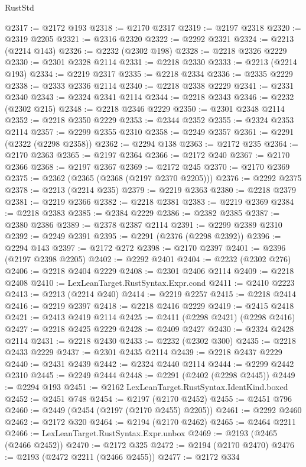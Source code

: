 \begin{lexlean}{RustStd}
\begin{coremodule}
{\begin{coremodule}
{{{{{{{{{{{{{{{{{{{{{{{{{{@2317 := @2172 @193
@2318 := @2170 @2317
@2319 := @2197 @2318
@2320 := @2319 @2205
@2321 := @2316 @2320
@2322 := @2292 @2321
@2324 := @2213 (@2214 @143)
@2326 := @2232 (@2302 @198)
@2328 := @2218 @2326 @2229
@2330 := @2301 @2328 @2114
@2331 := @2218 @2330
@2333 := @2213 (@2214 @193)
@2334 := @2219 @2317
@2335 := @2218 @2334
@2336 := @2335 @2229
@2338 := @2333 @2336 @2114
@2340 := @2218 @2338 @2229
@2341 := @2331 @2340
@2343 := @2324 @2341 @2114
@2344 := @2218 @2343
@2346 := @2232 (@2302 @215)
@2348 := @2218 @2346 @2229
@2350 := @2301 @2348 @2114
@2352 := @2218 @2350 @2229
@2353 := @2344 @2352
@2355 := @2324 @2353 @2114
@2357 := @2299 @2355 @2310
@2358 := @2249 @2357
@2361 := @2291 (@2322 (@2298 @2358))
@2362 := @2294 @138
@2363 := @2172 @235
@2364 := @2170 @2363
@2365 := @2197 @2364
@2366 := @2172 @240
@2367 := @2170 @2366
@2368 := @2197 @2367
@2369 := @2172 @245
@2370 := @2170 @2369
@2375 := @2362 (@2365 (@2368 (@2197 @2370 @2205)))
@2376 := @2292 @2375
@2378 := @2213 (@2214 @235)
@2379 := @2219 @2363
@2380 := @2218 @2379
@2381 := @2219 @2366
@2382 := @2218 @2381
@2383 := @2219 @2369
@2384 := @2218 @2383
@2385 := @2384 @2229
@2386 := @2382 @2385
@2387 := @2380 @2386
@2389 := @2378 @2387 @2114
@2391 := @2299 @2389 @2310
@2392 := @2249 @2391
@2395 := @2291 (@2376 (@2298 @2392))
@2396 := @2294 @143
@2397 := @2172 @272
@2398 := @2170 @2397
@2401 := @2396 (@2197 @2398 @2205)
@2402 := @2292 @2401
@2404 := @2232 (@2302 @276)
@2406 := @2218 @2404 @2229
@2408 := @2301 @2406 @2114
@2409 := @2218 @2408
@2410 := LexLeanTarget.RustSyntax.Expr.cond
@2411 := @2410 @2223
@2413 := @2213 (@2214 @240)
@2414 := @2219 @2257
@2415 := @2218 @2414
@2416 := @2219 @2397
@2418 := @2218 @2416 @2229
@2419 := @2415 @2418
@2421 := @2413 @2419 @2114
@2425 := @2411 (@2298 @2421) (@2298 @2416)
@2427 := @2218 @2425 @2229
@2428 := @2409 @2427
@2430 := @2324 @2428 @2114
@2431 := @2218 @2430
@2433 := @2232 (@2302 @300)
@2435 := @2218 @2433 @2229
@2437 := @2301 @2435 @2114
@2439 := @2218 @2437 @2229
@2440 := @2431 @2439
@2442 := @2324 @2440 @2114
@2444 := @2299 @2442 @2310
@2445 := @2249 @2444
@2448 := @2291 (@2402 (@2298 @2445))
@2449 := @2294 @193
@2451 := @2162 LexLeanTarget.RustSyntax.IdentKind.boxed
@2452 := @2451 @748
@2454 := @2197 (@2170 @2452)
@2455 := @2451 @796
@2460 := @2449 (@2454 (@2197 (@2170 @2455) @2205))
@2461 := @2292 @2460
@2462 := @2172 @320
@2464 := @2194 (@2170 @2462)
@2465 := @2464 @2211
@2466 := LexLeanTarget.RustSyntax.Expr.unbox
@2469 := @2193 (@2465 (@2466 @2452))
@2470 := @2172 @325
@2472 := @2194 (@2170 @2470)
@2476 := @2193 (@2472 @2211 (@2466 @2455))
@2477 := @2172 @334
}}}}}}}}}}}}}}}}}}}}}}}}}}
\end{coremodule}}
\end{coremodule}
\end{lexlean}
